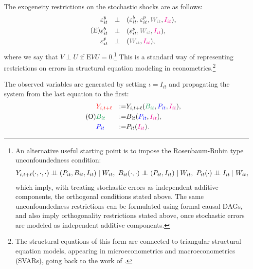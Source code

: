 \documentclass[3p, longtitle]{elsarticle}
\theoremstyle{definition}
\newcommand\indep{\protect\mathpalette{\protect\independenT}{\perp}}
\def\independenT#1#2{\mathrel{\setbox0\hbox{$#1#2$}%
    \copy0\kern-\wd0\mkern4mu\box0}}
\newcommand{\Ep}{{\mathrm{E}}}
\def\bcolor{\color{ForestGreen}}
\def\pcolor{\color{blue}}
\def\icolor{\color{magenta}}
\def\wcolor{\color{gray}}
\def\ycolor{\color{red}}
\begin{document}
The exogeneity restrictions on the stochastic shocks are as follows:
\begin{equation}\label{eqn:SEM2} \tag{E}
\begin{aligned}
   & \varepsilon^y_{it} &  \perp &  \quad (\varepsilon^b_{it}, \varepsilon^p_{it}, {\wcolor W_{it}}, {\icolor I_{it}}), \\
&  \varepsilon^b_{it}  & \perp & \quad  (\varepsilon^p_{it}, {\wcolor W_{it}}, {\icolor I_{it}}), \\
&   \varepsilon^p_{it} &  \perp &  \quad ({\wcolor W_{it}}, {\icolor I_{it}}),
\end{aligned}
\end{equation}
where we say that $V \perp U$ if $\Ep VU = 0$.\footnote{ An alternative useful
starting point is to impose the Rosenbaum-Rubin type unconfoundedness condition:
$$
Y_{i,t+\ell} (\cdot,\cdot,\cdot)  \indep (P_{it}, B_{it}, I_{it})  \mid W_{it}, \
B_{it} (\cdot,\cdot)  \indep (P_{it}, I_{it})  \mid W_{it}, \
 P_{it} (\cdot)  \indep  I_{it}  \mid W_{it},
$$
which imply, with treating stochastic errors as independent additive components, the orthogonal conditions stated above.
The same unconfoundedness restrictions can be formulated using formal causal DAGs, and also imply orthogonality restrictions stated above, once stochastic errors are modeled as independent additive components.} This is a standard way of representing restrictions on errors in structural equation modeling in econometrics.\footnote{The structural equations of this form are connected to triangular structural equation models, appearing in microeconometrics and macroeconometrics (SVARs), going back to the work of  \cite{strotz1960recursive}.}


The observed variables are generated by setting $\iota = I_{it}$ and propagating
the system from the last equation to the first:
\begin{equation} \label{eqn:SEMO}\tag{O}
\begin{aligned}
& {\ycolor Y_{i,t+\ell}}  & := & Y_{i,t+\ell} ( {\bcolor B_{it} } ,{\pcolor P_{it}}, {\icolor I_{it}}), \\
& {\bcolor B_{it} } & := &   B_{it}({\pcolor P_{it} } ,{\icolor I_{it}}), \\
& {\pcolor P_{it} }& := &  P_{it}({\icolor I_{it}}). \end{aligned}
\end{equation}
\end{document}
